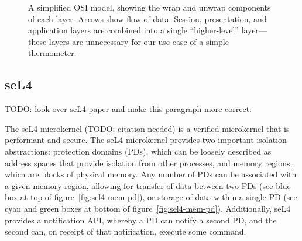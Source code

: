 \documentclass[twoside]{memoir}
\begin{document}
\begin{figure}[htpb]

    
    \caption{A simplified OSI model, showing the wrap and unwrap components of each layer. Arrows show flow of data. Session, presentation, and application layers are combined into a single ``higher-level'' layer---these layers are unnecessary for our use case of a simple thermometer.}
    \label{fig:network-stack}
\end{figure}

\subsection{seL4}

TODO: look over seL4 paper and make this paragraph more correct:

The seL4 microkernel (TODO: citation needed) is a verified microkernel
that is performant and secure.
The seL4 microkernel provides two important isolation abstractions:
protection domains (PDs),
which can be loosely described as address spaces that provide isolation from
other processes,
and memory regions, which are blocks of physical memory.
Any number of PDs can be associated with a given memory region,
allowing for transfer of data between two PDs 
(see blue box at top of figure~\ref{fig:sel4-mem-pd}),
or storage of data within
a single PD
(see cyan and green boxes at bottom of figure~\ref{fig:sel4-mem-pd}).
Additionally, seL4 provides a notification API,
whereby a PD can notify a second PD, and the second can,
on receipt of that notification, execute some command.
\end{document}
